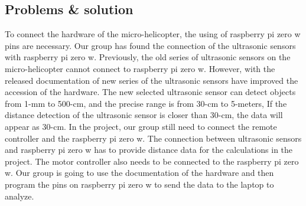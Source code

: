 \documentclass[onecolumn, draftclsnofoot,10pt, compsoc]{IEEEtran}
\begin{document}
\subsection{Problems \& solution}
To connect the hardware of the micro-helicopter, the using of raspberry pi zero w pins are necessary. Our group has found the connection of the ultrasonic sensors with raspberry pi zero w. Previously, the old series of ultrasonic sensors on the micro-helicopter cannot connect to raspberry pi zero w. However, with the released documentation of new series of the ultrasonic sensors have improved the accession of the hardware. The new selected ultrasonic sensor can detect objects from 1-mm to 500-cm, and the precise range is from 30-cm to 5-meters, If the distance detection of the ultrasonic sensor is closer than 30-cm, the data will appear as 30-cm.
In the project, our group still need to connect the remote controller and the raspberry pi zero w. The connection between ultrasonic sensors and raspberry pi zero w has to provide distance data for the calculations in the project. The motor controller also needs to be connected to the raspberry pi zero w. Our group is going to use the documentation of the hardware and then program the pins on raspberry pi zero w to send the data to the laptop to analyze.
\end{document}
